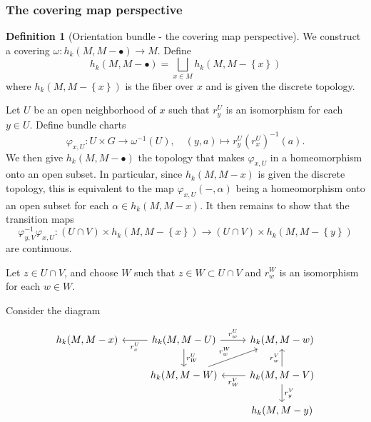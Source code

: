 \documentclass[reqno]{amsart}
\theoremstyle{definition}
\newtheorem{definition}[theorem]{Definition}
\theoremstyle{remark}
\begin{document}
\subsubsection{The covering map perspective}

\begin{definition}[Orientation bundle - the covering map perspective]
    We construct a covering
    $\omega \colon h_k(M, M - \bullet) \to  M$.
    Define
    \[
    h_k(M, M - \bullet) =
    \bigsqcup_{x \in M} 
    h_k(M, M- \left\{ x \right\} )
    \] 
    where $h_k(M, M - \left\{ x \right\} )$ is
    the fiber over $x$ and is given
    the discrete topology.

    Let $U$ be an open neighborhood of
    $x$ such that $r_{y}^{U}$ is an isomorphism
    for each $y \in U$.
    Define bundle charts
    \[
    \varphi_{x,U} \colon U \times G
    \to \omega^{-1} (U), \quad
    (y,a) \mapsto r_y^{U}\left( r_x^{U} \right)^{-1} (a).
    \] 
    We then give $h_k(M, M - \bullet)$ the
    topology that makes
    $\varphi_{x,U}$ in a homeomorphism onto
    an open subset. In particular, since
    $h_k(M,M-x)$ is given the
    discrete topology, this is equivalent to
    the map $\varphi_{x,U}(-,\alpha)$ being a homeomorphism
    onto an open subset for each
    $\alpha \in 
    h_k(M, M- x)$.
    It then remains to show that the transition maps
    \[
    \varphi_{y,V}^{-1} \varphi_{x,U} \colon
    (U \cap V) \times 
    h_k(M, M - \left\{ x \right\} )
    \to \left( U \cap V \right) \times 
    h_k(M, M- \left\{ y \right\} )
    \] 
    are continuous.

    Let $z \in U \cap V$, and choose $W$ such that
    $z \in W \subset U \cap V$ and
    $r_{w}^{W}$ is an isomorphism for each $w \in W$.

    Consider the diagram

    \begin{equation*}
    \begin{tikzcd}
        h_k(M, M - x) & \ar[l, "r_x^{U}"] 
        h_k(M, M -U) \ar[r, "r_w^{U}"] 
        \ar[d, "r_{W}^{U}"] & 
        h_k(M, M - w) \\
        & h_k(M, M -W) \ar[ru, "r_w^{W}"] 
        & h_k(M, M - V) \ar[l, "r_W^{V}"] 
        \ar[u, "r_w^{V}"] \ar[d, "r_y^{V}"] \\
        && h_k(M,M-y)
    \end{tikzcd}
    \end{equation*}


\end{definition}
\end{document}
